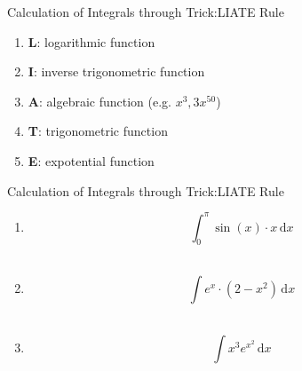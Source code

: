\documentclass[10pt, aspectratio=1610]{beamer}
\begin{document}
\begin{frame}{Calculation of Integrals through Trick:LIATE Rule}
  \begin{tcolorbox}[enhanced,colback=red!5!white,frame style={left color=red!75!black,right color=blue!75!black},
    sharp corners=uphill,arc=6mm,boxrule=2mm,boxsep=5mm,title=Choosing $g(x)$ that comes first in the following list]
    \begin{enumerate}
      \item \textbf{L}: logarithmic function\\
      \item \textbf{I}: inverse trigonometric function\\
      \item \textbf{A}: algebraic function (e.g. $x^3, 3x^{50}$)\\
      \item \textbf{T}: trigonometric function\\
      \item \textbf{E}: expotential function
    \end{enumerate}
  \end{tcolorbox}
\end{frame}

\begin{frame}{Calculation of Integrals through Trick:LIATE Rule}\label{slide:6}
  \begin{tcolorbox}[enhanced,frame style image=blueshade.png,
    opacityback=0.75,opacitybacktitle=0.25,
    colback=blue!5!white,colframe=blue!75!black,
    title=Exercises]
    \begin{enumerate}
      \item \begin{equation}\label{qe:1}
        \int_{0}^{\pi} \sin{(x)}\cdot x\,\mathrm{d}x
      \end{equation}
      \pause
      \hfill 
      \hyperlink{slide:7}{}\\
      \pause
      \item \begin{equation}\label{qe:2}
        \int e^{x}\cdot (2-x^2)\,\mathrm{d}x
      \end{equation}
      \pause
      \hfill
      \hyperlink{slide:8}{}\\
      \pause
      \item \begin{equation}\label{qe:3}
        \int x^3 e^{x^{2}}\,\mathrm{d}x
      \end{equation}
      \pause
      \hfill
      \hyperlink{slide:9}{}
    \end{enumerate}
  \end{tcolorbox}
\end{frame}
\end{document}
